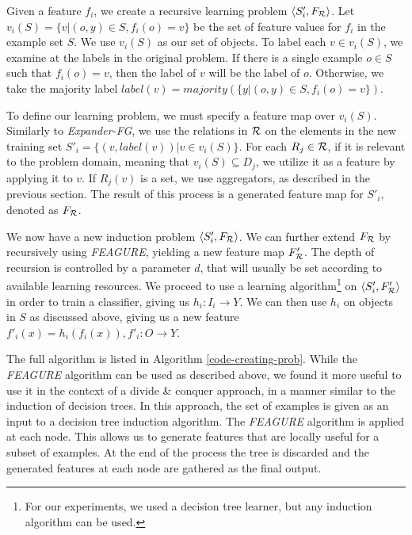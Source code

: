 \documentclass{article}
\theoremstyle{definition}
\begin{document}
Given a feature $f_{i}$, we create a recursive learning problem $\langle S'_i,F_{\cal R} \rangle$. %
Let $v_i(S) = \{v | (o,y) \in S, f_{i}(o)=v\}$ be the set of feature values for $f_i$ in the example set $S$. %
We use $v_i(S)$ as our set of objects. To label each $v \in v_i(S)$, we examine at the labels in the original problem.
If there is a single example $o \in S$ such that $f_i(o)=v$, then the label of $v$ will be the label of $o$. Otherwise, we take the majority label  $label(v)=majority(\{y|(o,y)\in S, f_i(o)=v\})$.

To define our learning problem, we must specify a feature map over $v_i(S)$. Similarly to \emph{Expander-FG}, we use the relations in ${\cal R}$ on the elements in the new training set $S'_i = \{ (v, label(v)) | v \in v_i(S) \}$.
For each $R_j\in {\cal R}$, if it is relevant to the problem domain, meaning that $v_i(S)\subseteq D_j$, we utilize it as a feature by applying it to $v$. If $R_j(v)$ is a set, we use aggregators, as described in the previous section. 
The result of this process is a generated feature map for $S'_i$, denoted as $F_{\cal R}$. 

We now have a new induction problem $\langle S'_i,F_{\cal R} \rangle$.
We can further extend $F_{\cal R}$ by recursively using \emph{FEAGURE}, yielding a new feature map $F'_{\cal R}$. The depth of recursion is controlled by a parameter $d$, that will usually be set according to available learning resources.
We proceed to use a learning algorithm\footnote{For our experiments, we used a decision tree learner, but any induction algorithm can be used.} on $\langle S'_i,F'_{\cal R} \rangle$ in order to train a classifier, giving us $h_i:I_i\rightarrow Y$. We can then use $h_i$ on objects in $S$ as discussed above, giving us a new feature $f'_{i}(x)=h_{i}(f_{i}(x)), f'_{i}:O\rightarrow Y$. 

The full algorithm is listed in Algorithm \ref{code-creating-prob}.
While the \emph{FEAGURE} algorithm can be used as described above, we found it more useful to use it in the context of a divide \& conquer approach, in a manner similar to the induction of decision trees.
In this approach, the set of examples is given as an input to a decision tree induction algorithm. The \emph{FEAGURE} algorithm is applied at each node. 
This allows us to generate features that are locally useful for a subset of examples.
At the end of the process the tree is discarded and the generated features at each node are gathered as the final output.
\end{document}
